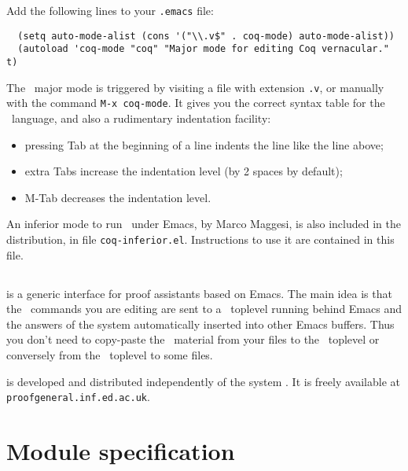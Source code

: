 Add the following lines to your \verb!.emacs! file:

\begin{verbatim}
  (setq auto-mode-alist (cons '("\\.v$" . coq-mode) auto-mode-alist))
  (autoload 'coq-mode "coq" "Major mode for editing Coq vernacular." t)
\end{verbatim}

The \Coq\ major mode is triggered by visiting a file with extension {\tt .v},
or manually with the command \verb!M-x coq-mode!.
It gives you the correct syntax table for
the \Coq\ language, and also a rudimentary indentation facility:
\begin{itemize}
  \item pressing {\sc Tab} at the beginning of a line indents the line like
    the line above;

  \item extra {\sc Tab}s increase the indentation level
    (by 2 spaces by default);

  \item M-{\sc Tab} decreases the indentation level.
\end{itemize}

An inferior mode to run \Coq\ under Emacs, by Marco Maggesi, is also
included in the distribution, in file \texttt{coq-inferior.el}.
Instructions to use it are contained in this file.

\subsection[{\ProofGeneral}]{{\ProofGeneral}\index{\ProofGeneral}}

{\ProofGeneral} is a generic interface for proof assistants based on
Emacs. The main idea is that the \Coq\ commands you are
editing are sent to a \Coq\ toplevel running behind Emacs and the
answers of the system automatically inserted into other Emacs buffers. 
Thus you don't need to copy-paste the \Coq\ material from your files
to the \Coq\ toplevel or conversely from the \Coq\ toplevel to some
files. 

{\ProofGeneral} is developed and distributed independently of the
system \Coq. It is freely available at \verb!proofgeneral.inf.ed.ac.uk!.


\section[Module specification]{Module specification\label{gallina}}

